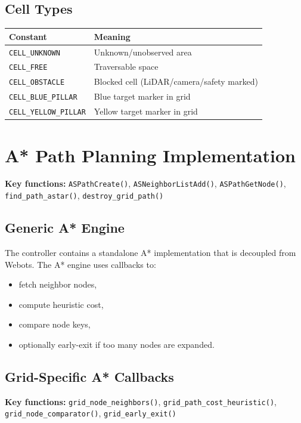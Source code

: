 \documentclass[12pt,a4paper]{article}
\begin{document}
\subsection{Cell Types}
\begin{center}
\begin{tabular}{ll}
\toprule
\textbf{Constant} & \textbf{Meaning} \\
\midrule
\texttt{CELL\_UNKNOWN} & Unknown/unobserved area \\
\texttt{CELL\_FREE} & Traversable space \\
\texttt{CELL\_OBSTACLE} & Blocked cell (LiDAR/camera/safety marked) \\
\texttt{CELL\_BLUE\_PILLAR} & Blue target marker in grid \\
\texttt{CELL\_YELLOW\_PILLAR} & Yellow target marker in grid \\
\bottomrule
\end{tabular}
\end{center}

\section{A* Path Planning Implementation}
\textbf{Key functions:} \texttt{ASPathCreate()}, \texttt{ASNeighborListAdd()}, \texttt{ASPathGetNode()},
\texttt{find\_path\_astar()}, \texttt{destroy\_grid\_path()}

\subsection{Generic A* Engine}
The controller contains a standalone A* implementation that is decoupled from Webots. The A* engine uses callbacks to:
\begin{itemize}[leftmargin=2em]
  \item fetch neighbor nodes,
  \item compute heuristic cost,
  \item compare node keys,
  \item optionally early-exit if too many nodes are expanded.
\end{itemize}

\subsection{Grid-Specific A* Callbacks}
\textbf{Key functions:} \texttt{grid\_node\_neighbors()}, \texttt{grid\_path\_cost\_heuristic()},
\texttt{grid\_node\_comparator()}, \texttt{grid\_early\_exit()}
\end{document}
